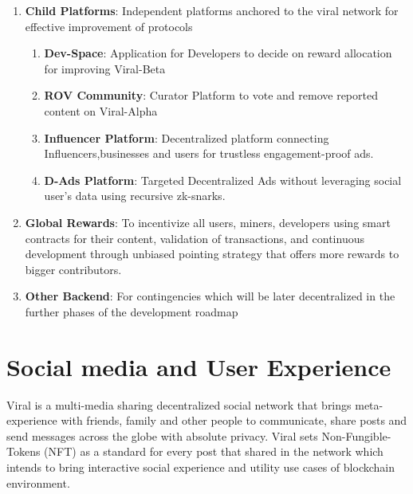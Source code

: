 \documentclass[conference]{IEEEtran}
\begin{document}
\begin{enumerate}[wide, labelwidth=!, labelindent=0pt]
\begin{enumerate}[wide, labelwidth=!, labelindent=0pt]
\end{enumerate}

\item \textbf{Child Platforms}: Independent platforms anchored to the viral network for effective improvement of protocols

\begin{enumerate}[wide, labelwidth=!, labelindent=0pt]

\item \textbf{Dev-Space}: Application for Developers to decide on reward allocation for improving Viral-Beta

\item \textbf{ROV Community}: Curator Platform to vote and remove reported content on Viral-Alpha
\item \textbf{Influencer Platform}: Decentralized platform connecting Influencers,businesses and users for trustless engagement-proof ads.

\item \textbf{D-Ads Platform}: Targeted Decentralized Ads without leveraging social user's data using recursive zk-snarks.

\end{enumerate}

\item \textbf{Global Rewards}: To incentivize all users, miners, developers using smart contracts for their content, validation of transactions, and continuous development through unbiased pointing strategy that offers more rewards to bigger contributors.


\item \textbf{Other Backend}: For contingencies which will be later decentralized in the further phases of the development roadmap

\end{enumerate}

\section{\textbf{Social media and User Experience}}
Viral is a multi-media sharing decentralized social network that brings meta-experience with friends, family and other people to communicate, share posts and send messages across the globe with absolute privacy. Viral sets Non-Fungible-Tokens (NFT) as a standard for every post that shared in the network which intends to bring interactive social experience and utility use cases of blockchain environment.\\
\end{document}
